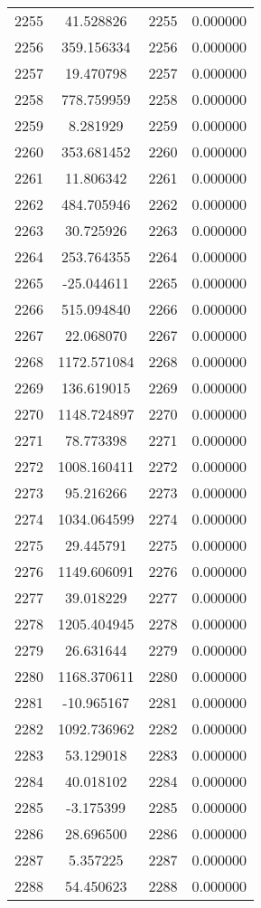 \documentclass[12pt]{article}
\begin{document}
\begin{longtable}{@{}cccc@{}}
2255 & 41.528826 & 2255 & 0.000000 \\
2256 & 359.156334 & 2256 & 0.000000 \\
2257 & 19.470798 & 2257 & 0.000000 \\
2258 & 778.759959 & 2258 & 0.000000 \\
2259 & 8.281929 & 2259 & 0.000000 \\
2260 & 353.681452 & 2260 & 0.000000 \\
2261 & 11.806342 & 2261 & 0.000000 \\
2262 & 484.705946 & 2262 & 0.000000 \\
2263 & 30.725926 & 2263 & 0.000000 \\
2264 & 253.764355 & 2264 & 0.000000 \\
2265 & -25.044611 & 2265 & 0.000000 \\
2266 & 515.094840 & 2266 & 0.000000 \\
2267 & 22.068070 & 2267 & 0.000000 \\
2268 & 1172.571084 & 2268 & 0.000000 \\
2269 & 136.619015 & 2269 & 0.000000 \\
2270 & 1148.724897 & 2270 & 0.000000 \\
2271 & 78.773398 & 2271 & 0.000000 \\
2272 & 1008.160411 & 2272 & 0.000000 \\
2273 & 95.216266 & 2273 & 0.000000 \\
2274 & 1034.064599 & 2274 & 0.000000 \\
2275 & 29.445791 & 2275 & 0.000000 \\
2276 & 1149.606091 & 2276 & 0.000000 \\
2277 & 39.018229 & 2277 & 0.000000 \\
2278 & 1205.404945 & 2278 & 0.000000 \\
2279 & 26.631644 & 2279 & 0.000000 \\
2280 & 1168.370611 & 2280 & 0.000000 \\
2281 & -10.965167 & 2281 & 0.000000 \\
2282 & 1092.736962 & 2282 & 0.000000 \\
2283 & 53.129018 & 2283 & 0.000000 \\
2284 & 40.018102 & 2284 & 0.000000 \\
2285 & -3.175399 & 2285 & 0.000000 \\
2286 & 28.696500 & 2286 & 0.000000 \\
2287 & 5.357225 & 2287 & 0.000000 \\
2288 & 54.450623 & 2288 & 0.000000 \\

\end{longtable}
\end{document}
